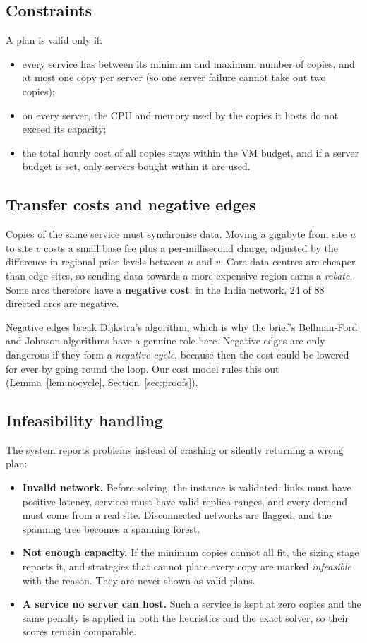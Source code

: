 \subsection{Constraints}
A plan is valid only if:
\begin{itemize}[leftmargin=*]
  \item every service has between its minimum and maximum number of copies, and at most one copy per server (so one server failure cannot take out two copies);
  \item on every server, the CPU and memory used by the copies it hosts do not exceed its capacity;
  \item the total hourly cost of all copies stays within the VM budget, and if a server budget is set, only servers bought within it are used.
\end{itemize}

\subsection{Transfer costs and negative edges}
Copies of the same service must synchronise data. Moving a gigabyte from site $u$ to site $v$ costs a small base fee plus a per-millisecond charge, adjusted by the difference in regional price levels between $u$ and $v$. Core data centres are cheaper than edge sites, so sending data towards a more expensive region earns a \emph{rebate}. Some arcs therefore have a \textbf{negative cost}: in the India network, 24 of 88 directed arcs are negative.

Negative edges break Dijkstra's algorithm, which is why the brief's Bellman-Ford and Johnson algorithms have a genuine role here. Negative edges are only dangerous if they form a \emph{negative cycle}, because then the cost could be lowered for ever by going round the loop. Our cost model rules this out (Lemma~\ref{lem:nocycle}, Section~\ref{sec:proofs}).

\subsection{Infeasibility handling}
The system reports problems instead of crashing or silently returning a wrong plan:
\begin{itemize}[leftmargin=*]
  \item \textbf{Invalid network.} Before solving, the instance is validated: links must have positive latency, services must have valid replica ranges, and every demand must come from a real site. Disconnected networks are flagged, and the spanning tree becomes a spanning forest.
  \item \textbf{Not enough capacity.} If the minimum copies cannot all fit, the sizing stage reports it, and strategies that cannot place every copy are marked \emph{infeasible} with the reason. They are never shown as valid plans.
  \item \textbf{A service no server can host.} Such a service is kept at zero copies and the same penalty is applied in both the heuristics and the exact solver, so their scores remain comparable.
\end{itemize}

